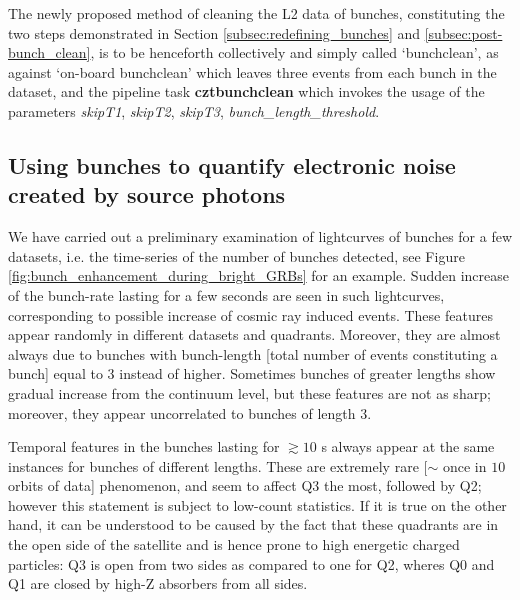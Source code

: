 The newly proposed method of cleaning the L2 data of bunches, constituting the two steps demonstrated in Section \ref{subsec:redefining_bunches} and \ref{subsec:post-bunch_clean}, is to be henceforth collectively and simply called `bunchclean', as against `on-board bunchclean' which leaves three events from each bunch in the dataset, and the pipeline task \textbf{cztbunchclean} which invokes the usage of the parameters \emph{skipT1}, \emph{skipT2}, \emph{skipT3}, \emph{bunch\_length\_threshold}.


\subsection{Using bunches to quantify electronic noise created by source photons}
\label{subsec:electronic_effects}

We have carried out a preliminary examination of lightcurves of bunches for a few datasets, i.e. the time-series of the number of bunches detected, see Figure \ref{fig:bunch_enhancement_during_bright_GRBs} for an example. Sudden increase of the bunch-rate lasting for a few seconds are seen in such lightcurves, corresponding to possible increase of cosmic ray induced events. These features appear randomly in different datasets and quadrants. Moreover, they are almost always due to bunches with bunch-length [total number of events constituting a bunch] equal to $3$ instead of higher. Sometimes bunches of greater lengths show gradual increase from the continuum level, but these features are not as sharp; moreover, they appear uncorrelated to bunches of length $3$.

Temporal features in the bunches lasting for $\gtrsim 10$ s always appear at the same instances for bunches of different lengths. These are extremely rare [$\sim$ once in $10$ orbits of data] phenomenon, and seem to affect Q3 the most, followed by Q2; however this statement is subject to low-count statistics. If it is true on the other hand, it can be understood to be caused by the fact that these quadrants are in the open side of the satellite and is hence prone to high energetic charged particles: Q3 is open from two sides as compared to one for Q2, wheres Q0 and Q1 are closed by high-Z absorbers from all sides.

